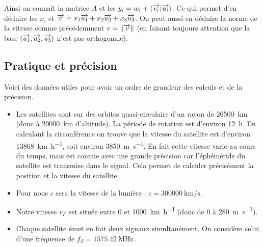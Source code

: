 \documentclass[class=report,crop=false]{standalone}
\begin{document}
Ainsi on connaît la matrice $A$ et les $y_i = w_i + \langle \overrightarrow{v_i} | \overrightarrow{u_i} \rangle$. Ce qui permet d'en déduire
les $x_i$ et 
$\overrightarrow v = x_1 \overrightarrow{u_1}+x_2 \overrightarrow{u_2}+x_3 \overrightarrow{u_3}$.
On peut aussi en déduire la norme de la vitesse comme précédemment
$v = \| \overrightarrow v \|$ (en faisant toujours attention que la base
$(\overrightarrow {u_1}, \overrightarrow {u_2}, \overrightarrow {u_3})$ n'est pas orthogonale).


\subsection{Pratique et précision}

Voici des données utiles pour avoir un ordre de grandeur des calculs et de la précision.

\begin{itemize}
  \item Les satellites sont sur des orbites quasi-circulaire d'un rayon de 
  \SI{26500}{\kilo\meter} (donc à \SI{20000}{\kilo\meter} d'altitude).
  La période de rotation est d'environ \SI{12}{\hour}.
  En calculant la circonférence on trouve que la vitesse du satellite est d'environ
  \SI{13868}{\kilo\meter\per\hour}, soit environ \SI{3850}{\meter\per\second}.
  En fait cette vitesse varie au cours du temps, mais est connue avec une grande précision 
  car l'éphéméride du satellite est transmise dans le signal. Cela permet de calculer
  précisément la position et la vitesse du satellite.
 
  
  \item Pour nous $c$ sera la vitesse de la lumière :
  $c = \SI{300000}{\kilo\meter\per\second}$.
  
  \item Notre vitesse $v_P$ est située entre $0$ et \SI{1000}{\kilo\meter\per\hour}
  (donc de $0$ à \SI{280}{\meter\per\second}).
  
  \item Chaque satellite émet en fait deux signaux simultanément. On considère celui
  d'une fréquence de $f_S = \SI{1575.42}{\mega\hertz}$.
  
\end{itemize}
\end{document}
